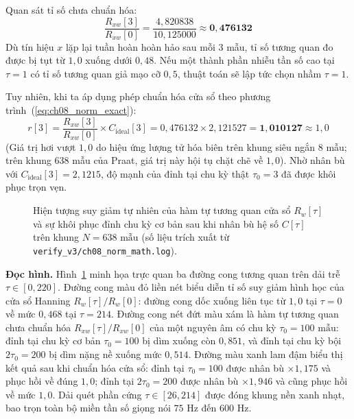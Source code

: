 Quan sát tỉ số chưa chuẩn hóa:
\begin{equation}
\frac{R_{xw}[3]}{R_{xw}[0]} = \frac{4{,}820838}{10{,}125000} \approx \mathbf{0{,}476132}
\end{equation}
Dù tín hiệu $x$ lặp lại tuần hoàn hoàn hảo sau mỗi 3 mẫu, tỉ số tương quan đo được bị tụt từ $1{,}0$ xuống dưới $0{,}48$. Nếu một thành phần nhiễu tần số cao tại $\tau = 1$ có tỉ số tương quan giả mạo cỡ $0{,}5$, thuật toán sẽ lập tức chọn nhầm $\tau = 1$.

Tuy nhiên, khi ta áp dụng phép chuẩn hóa cửa sổ theo phương trình~(\ref{eq:ch08_norm_exact}):
\begin{equation}
r[3] = \frac{R_{xw}[3]}{R_{xw}[0]} \times C_{\text{ideal}}[3] = 0{,}476132 \times 2{,}121527 = \mathbf{1{,}010127} \approx 1{,}0
\end{equation}
(Giá trị hơi vượt $1{,}0$ do hiệu ứng lượng tử hóa biên trên khung siêu ngắn 8 mẫu; trên khung 638 mẫu của Praat, giá trị này hội tụ chặt chẽ về $1{,}0$). Nhờ nhân bù với $C_{\text{ideal}}[3] = 2{,}1215$, độ mạnh của đỉnh tại chu kỳ thật $\tau_0 = 3$ đã được khôi phục trọn vẹn.

\begin{figure}[htbp]
\centering
\resizebox{0.95\textwidth}{!}{}
\caption{Hiện tượng suy giảm tự nhiên của hàm tự tương quan cửa sổ $R_w[\tau]$ và sự khôi phục đỉnh chu kỳ cơ bản sau khi nhân bù hệ số $C[\tau]$ trên khung $N = 638\text{ mẫu}$ (số liệu trích xuất từ \texttt{verify\_v3/ch08\_norm\_math.log}).}
\label{fig:ch08_window_effect}
\end{figure}

\textbf{Đọc hình.} Hình~\ref{fig:ch08_window_effect} minh họa trực quan ba đường cong tương quan trên dải trễ $\tau \in [0, 220]$. Đường cong màu đỏ liền nét biểu diễn tỉ số suy giảm hình học của cửa sổ Hanning $R_w[\tau]/R_w[0]$: đường cong dốc xuống liên tục từ $1{,}0$ tại $\tau = 0$ về mức $0{,}468$ tại $\tau = 214$. Đường cong nét đứt màu xám là hàm tự tương quan chưa chuẩn hóa $R_{xw}[\tau]/R_{xw}[0]$ của một nguyên âm có chu kỳ $\tau_0 = 100\text{ mẫu}$: đỉnh tại chu kỳ cơ bản $\tau_0 = 100$ bị dìm xuống còn $0{,}851$, và đỉnh tại chu kỳ bội $2\tau_0 = 200$ bị dìm nặng nề xuống mức $0{,}514$. Đường màu xanh lam đậm biểu thị kết quả sau khi chuẩn hóa cửa sổ: đỉnh tại $\tau_0 = 100$ được nhân bù $\times 1{,}175$ và phục hồi về đúng $1{,}0$; đỉnh tại $2\tau_0 = 200$ được nhân bù $\times 1{,}946$ và cũng phục hồi về mức $1{,}0$. Dải quét phần cứng $\tau \in [26, 214]$ được đóng khung nền xanh nhạt, bao trọn toàn bộ miền tần số giọng nói $75\text{ Hz}$ đến $600\text{ Hz}$.

